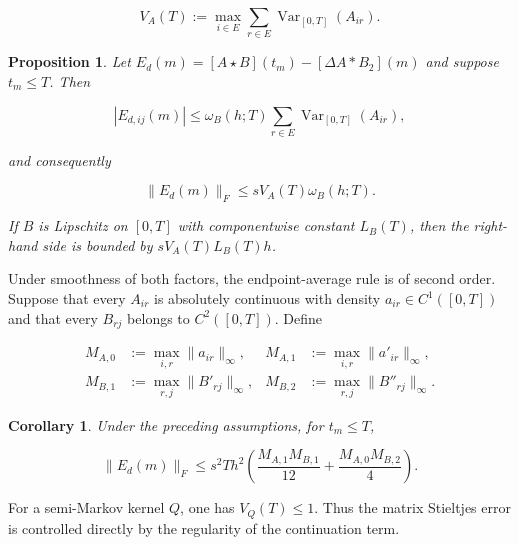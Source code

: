 \documentclass[3p,12pt,authoryear]{elsarticle}
\newtheorem{proposition}[theorem]{Proposition}
\newtheorem{corollary}[theorem]{Corollary}
\theoremstyle{definition}
\theoremstyle{remark}
\newcommand{\Var}{\operatorname{Var}}
\begin{document}
\begin{equation*}
V_A(T)
:=
\max_{i\in E}\sum_{r\in E}\Var_{[0,T]}(A_{ir}).
\end{equation*}


\begin{proposition}\label{prop:stieltjes-deterministic}
Let $E_d(m)=[A\star B](t_m)-[\Delta A*B_2](m)$ and suppose $t_m\leq T$. Then

\begin{equation}\label{eq:stieltjes-entry-error}
|E_{d,ij}(m)|
\leq
\omega_B(h;T)\sum_{r\in E}\Var_{[0,T]}(A_{ir}),
\end{equation}

and consequently

\begin{equation}\label{eq:stieltjes-frob-error}
\|E_d(m)\|_F
\leq
sV_A(T)\omega_B(h;T).
\end{equation}

If $B$ is Lipschitz on $[0,T]$ with componentwise constant $L_B(T)$, then the right-hand side is bounded by $sV_A(T)L_B(T)h$.
\end{proposition}

Under smoothness of both factors, the endpoint-average rule is of second order. Suppose that every $A_{ir}$ is absolutely continuous with density $a_{ir}\in C^1([0,T])$ and that every $B_{rj}$ belongs to $C^2([0,T])$. Define

\begin{equation*}
\begin{aligned}
M_{A,0}&:=\max_{i,r}\|a_{ir}\|_{\infty},
&
M_{A,1}&:=\max_{i,r}\|a'_{ir}\|_{\infty},\\
M_{B,1}&:=\max_{r,j}\|B'_{rj}\|_{\infty},
&
M_{B,2}&:=\max_{r,j}\|B''_{rj}\|_{\infty}.
\end{aligned}
\end{equation*}


\begin{corollary}\label{cor:stieltjes-second-order}
Under the preceding assumptions, for $t_m\leq T$,

\begin{equation}\label{eq:stieltjes-second-order}
\|E_d(m)\|_F
\leq
s^2T h^2
\left(
\frac{M_{A,1}M_{B,1}}{12}
+
\frac{M_{A,0}M_{B,2}}{4}
\right).
\end{equation}

\end{corollary}

For a semi-Markov kernel $Q$, one has $V_Q(T)\leq1$. Thus the matrix Stieltjes error is controlled directly by the regularity of the continuation term.
\end{document}
